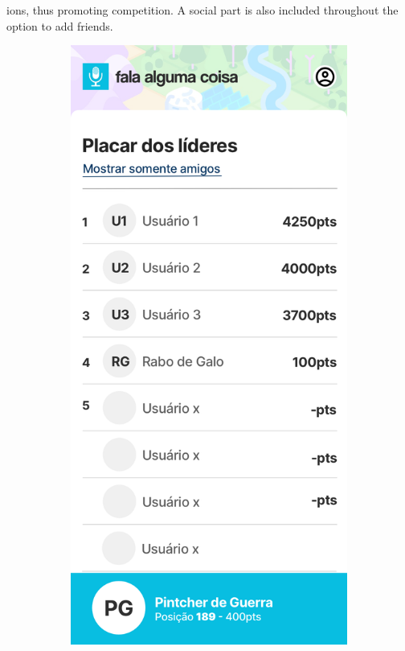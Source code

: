ions, thus promoting competition. A social part is also included throughout the option to add friends.

\begin{figure}[ht]
    \centering
    \caption{Fale Alguma Coisa Leaderboard Page designs}
    \begin{subfigure}{.5\textwidth}
      \centering
      \includegraphics[width=.9\linewidth]{images/app/leaderboard/GeneralRanking.png}

\end{subfigure}
\end{figure}
